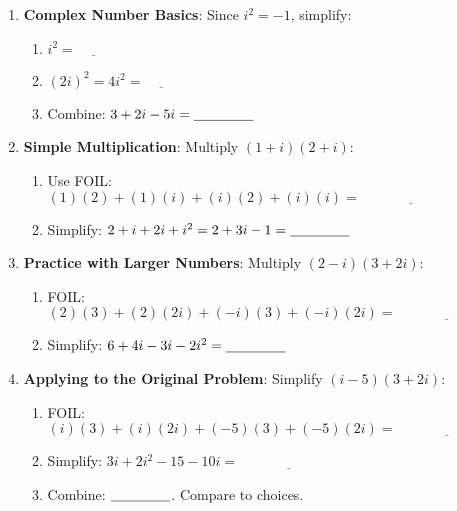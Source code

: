 \documentclass[12pt]{article}
\begin{document}
\begin{enumerate}[label=8.\arabic*]
    \item \textbf{Complex Number Basics}: Since \( i^2 = -1 \), simplify:
    \begin{enumerate}[label=\alph*)]
        \item \( i^2 = \underline{\hspace{1cm}} \)
        \item \( (2i)^2 = 4i^2 = \underline{\hspace{1cm}} \)
        \item Combine: \( 3 + 2i - 5i = \underline{\hspace{1.5cm}} \)
    \end{enumerate}
    \item \textbf{Simple Multiplication}: Multiply \( (1 + i)(2 + i) \):
    \begin{enumerate}[label=\alph*)]
        \item Use FOIL: \( (1)(2) + (1)(i) + (i)(2) + (i)(i) = \underline{\hspace{3cm}} \)
        \item Simplify: \( 2 + i + 2i + i^2 = 2 + 3i - 1 = \underline{\hspace{1.5cm}} \)
    \end{enumerate}
    \item \textbf{Practice with Larger Numbers}: Multiply \( (2 - i)(3 + 2i) \):
    \begin{enumerate}[label=\alph*)]
        \item FOIL: \( (2)(3) + (2)(2i) + (-i)(3) + (-i)(2i) = \underline{\hspace{3cm}} \)
        \item Simplify: \( 6 + 4i - 3i - 2i^2 = \underline{\hspace{1.5cm}} \)
    \end{enumerate}
    \item \textbf{Applying to the Original Problem}: Simplify \( (i - 5)(3 + 2i) \):
    \begin{enumerate}[label=\alph*)]
        \item FOIL: \( (i)(3) + (i)(2i) + (-5)(3) + (-5)(2i) = \underline{\hspace{3cm}} \)
        \item Simplify: \( 3i + 2i^2 - 15 - 10i = \underline{\hspace{3cm}} \)
        \item Combine: \( \underline{\hspace{1.5cm}} \). Compare to choices.
    \end{enumerate}
\end{enumerate}
\end{document}

